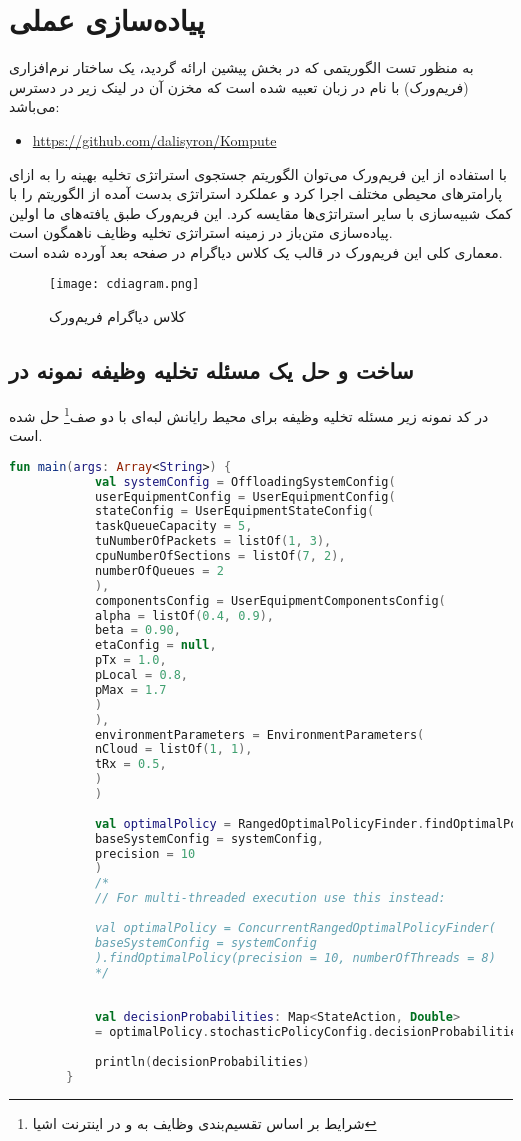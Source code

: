 \section{پیاده‌سازی عملی}
به منظور تست الگوریتمی که در بخش پیشین ارائه گردید، یک ساختار نرم‌افزاری (فریم‌ورک) با نام  در زبان  تعبیه شده است که مخزن آن در لینک زیر در دسترس می‌باشد:
\begin{latin}
	\begin{itemize}
		\item \href{https://github.com/dalisyron/Kompute}{https://github.com/dalisyron/Kompute}
	\end{itemize}
\end{latin}
با استفاده از این فریم‌ورک می‌توان الگوریتم جستجوی استراتژی تخلیه بهینه را به ازای پارامترهای محیطی مختلف اجرا کرد و عملکرد استراتژی بدست آمده از الگوریتم را با کمک شبیه‌سازی با سایر استراتژی‌ها مقایسه کرد. این فریم‌ورک طبق یافته‌های ما اولین پیاده‌سازی متن‌باز در زمینه استراتژی تخلیه وظایف ناهمگون است. \\

معماری کلی این فریم‌ورک در قالب یک کلاس دیاگرام در صفحه بعد آورده شده است.
\newpage
\begin{figure}[H]
	\texttt{[image: cdiagram.png]}
	\caption{کلاس دیاگرام فریم‌ورک }
\end{figure}
\newpage
\subsection{ساخت و حل یک مسئله تخلیه وظیفه نمونه در }
در کد نمونه زیر مسئله تخلیه وظیفه‌ برای محیط رایانش لبه‌ای با دو صف\footnote{شرایط بر اساس تقسیم‌بندی وظایف به  و  در اینترنت اشیا} حل شده است.
\begin{latin}
	\begin{lstlisting}[language=Kotlin]
		fun main(args: Array<String>) {
			val systemConfig = OffloadingSystemConfig(
			userEquipmentConfig = UserEquipmentConfig(
			stateConfig = UserEquipmentStateConfig(
			taskQueueCapacity = 5,
			tuNumberOfPackets = listOf(1, 3),
			cpuNumberOfSections = listOf(7, 2),
			numberOfQueues = 2
			),
			componentsConfig = UserEquipmentComponentsConfig(
			alpha = listOf(0.4, 0.9),
			beta = 0.90,
			etaConfig = null,
			pTx = 1.0,
			pLocal = 0.8,
			pMax = 1.7
			)
			),
			environmentParameters = EnvironmentParameters(
			nCloud = listOf(1, 1),
			tRx = 0.5,
			)
			)
			
			val optimalPolicy = RangedOptimalPolicyFinder.findOptimalPolicy(
			baseSystemConfig = systemConfig, 
			precision = 10
			)
			/*
			// For multi-threaded execution use this instead:
			
			val optimalPolicy = ConcurrentRangedOptimalPolicyFinder(
			baseSystemConfig = systemConfig
			).findOptimalPolicy(precision = 10, numberOfThreads = 8)
			*/
			
			
			val decisionProbabilities: Map<StateAction, Double>
			= optimalPolicy.stochasticPolicyConfig.decisionProbabilities
			
			println(decisionProbabilities)
		}
	\end{lstlisting}
\end{latin}
\newpage